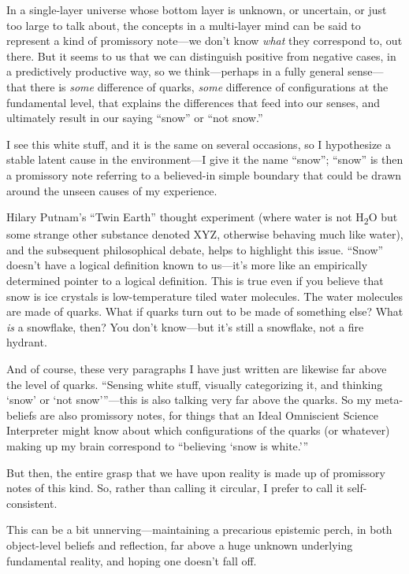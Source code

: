 {
 In a single-layer universe whose bottom layer is unknown, or
uncertain, or just too large to talk about, the concepts in a
multi-layer mind can be said to represent a kind of promissory
note---we don't know \textit{what} they correspond to,
out there. But it seems to us that we can distinguish positive from
negative cases, in a predictively productive way, so we think---perhaps
in a fully general sense---that there is \textit{some} difference of
quarks, \textit{some} difference of configurations at the fundamental
level, that explains the differences that feed into our senses, and
ultimately result in our saying
``snow'' or ``not
snow.''}

{
 I see this white stuff, and it is the same on several occasions,
so I hypothesize a stable latent cause in the environment---I give it
the name ``snow'';
``snow'' is then a promissory note
referring to a believed-in simple boundary that could be drawn around
the unseen causes of my experience.}

{
 Hilary Putnam's ``Twin
Earth'' thought experiment (where water is not
H\textsubscript{2}O but some strange other substance denoted XYZ,
otherwise behaving much like water), and the subsequent philosophical
debate, helps to highlight this issue.
``Snow'' doesn't
have a logical definition known to us---it's more like
an empirically determined pointer to a logical definition. This is true
even if you believe that snow is ice crystals is low-temperature tiled
water molecules. The water molecules are made of quarks. What if quarks
turn out to be made of something else? What \textit{is} a snowflake,
then? You don't know---but it's still a
snowflake, not a fire hydrant.}

{
 And of course, these very paragraphs I have just written are
likewise far above the level of quarks. ``Sensing
white stuff, visually categorizing it, and thinking
`snow' or `not
snow'''---this is also talking very
far above the quarks. So my meta-beliefs are also promissory notes, for
things that an Ideal Omniscient Science Interpreter might know about
which configurations of the quarks (or whatever) making up my brain
correspond to ``believing `snow is
white.'''}

{
 But then, the entire grasp that we have upon reality is made up of
promissory notes of this kind. So, rather than calling it circular, I
prefer to call it self-consistent.}

{
 This can be a bit unnerving---maintaining a precarious epistemic
perch, in both object-level beliefs and reflection, far above a huge
unknown underlying fundamental reality, and hoping one
doesn't fall off.}


